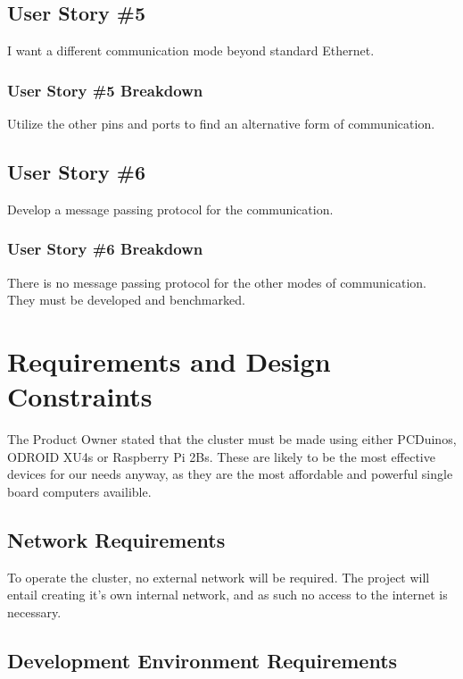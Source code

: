 \subsection{User Story \#5} 
I want a different communication mode beyond standard Ethernet.
\subsubsection{User Story \#5 Breakdown}
Utilize the other pins and ports to find an alternative form of communication.

\subsection{User Story \#6} 
Develop a message passing protocol for the communication.
\subsubsection{User Story \#6 Breakdown}
There is no message passing protocol for the other modes of communication. They must be developed and benchmarked.

\section{Requirements and Design Constraints}

The Product Owner stated that the cluster must be made using either PCDuinos, ODROID XU4s or Raspberry Pi 2Bs. These are likely to be  the most effective devices for our needs anyway, as they are the most affordable and powerful single board computers availible.


\subsection{Network Requirements}
To operate the cluster, no external network will be required. The project will entail creating it's own internal network, and as such no access to the internet is necessary.

\subsection{Development Environment Requirements}

